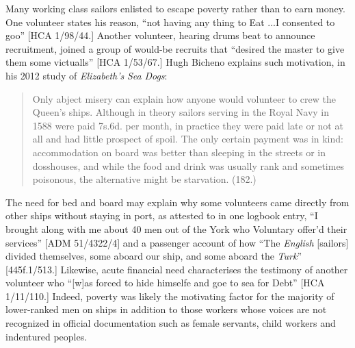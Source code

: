    Many working class sailors enlisted to escape poverty rather than to earn money. One volunteer states his reason, “not having any thing to Eat ...I consented to goo” [HCA 1/98/44.] Another volunteer, hearing drums beat to announce recruitment, joined a group of would-be recruits that “desired the master to give them some victualls” [HCA 1/53/67.] Hugh Bicheno explains such motivation, in his 2012 study of \textit{Elizabeth’s} \textit{Sea} \textit{Dogs}:

\begin{quotation}
Only abject misery can explain how anyone would volunteer to crew the Queen’s ships. Although in theory sailors serving in the Royal Navy in 1588 were paid 7s.6d. per month, in practice they were paid late or not at all and had little prospect of spoil. The only certain payment was in kind: accommodation on board was better than sleeping in the streets or in dosshouses, and while the food and drink was usually rank and sometimes poisonous, the alternative might be starvation. (182.)\end{quotation}

The need for bed and board may explain why some volunteers came directly from other ships without staying in port, as attested to in one logbook entry, “I brought along with me about 40 men out of the York who Voluntary offer’d their services” [ADM 51/4322/4] and a passenger account of how “The \textit{English} [sailors] divided themselves, some aboard our ship, and some aboard the \textit{Turk}” [445f.1/513.] Likewise, acute financial need characterises the testimony of another volunteer who “[w]as forced to hide himselfe and goe to sea for Debt” [HCA 1/11/110.] Indeed, poverty was likely the motivating factor for the majority of lower-ranked men on ships in addition to those workers whose voices are not recognized in official documentation such as female servants, child workers and indentured peoples.

